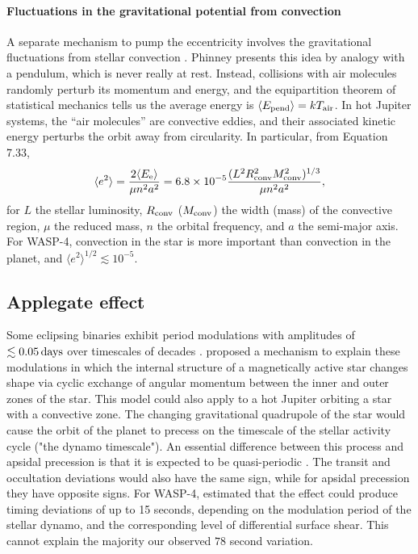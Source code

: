 \documentclass[12pt,twocolumn,tighten]{aastex62}
\begin{document}
\paragraph{Fluctuations in the gravitational potential from convection}
A separate mechanism to pump the eccentricity involves the
gravitational fluctuations from stellar convection \citep[][Section
7]{phinney_pulsars_1992}.  Phinney presents this idea by analogy with
a pendulum, which is never really at rest. Instead, collisions with
air molecules randomly perturb its momentum and energy, and the
equipartition theorem of statistical mechanics tells us the average
energy is $\langle E_{\rm pend} \rangle = k T_{\rm air}$.  In hot
Jupiter systems, the ``air molecules'' are convective eddies, and
their associated kinetic energy perturbs the orbit away from
circularity.  In particular, from \citealt{phinney_pulsars_1992}
Equation 7.33,
\begin{equation}
  \langle e^2 \rangle =
  \frac{ 2 \langle E_{\rm e} \rangle }{\mu n^2 a^2}
  = 6.8\times10^{-5}
  \frac{(L^2 R_{\rm conv}^2 M_{\rm conv}^2)^{1/3}}{\mu n^2 a^2},
\end{equation}
for $L$ the stellar luminosity, $R_{\rm conv}$ ($M_{\rm conv}$) the
width (mass) of the convective region,  $\mu$ the reduced mass, $n$
the orbital frequency, and $a$ the semi-major axis.  For WASP-4,
convection in the star is more important than convection in the
planet, and $\langle e^2 \rangle^{1/2} \lesssim 10^{-5}$.



\subsection{Applegate effect}
Some eclipsing binaries exhibit period modulations with amplitudes of
$\lesssim 0.05\,{\rm days}$ over timescales of decades \citep[{\it
e.g.},][]{soderhjelm_geometry_1980,hall_relation_1989}.
\citet{applegate_mechanism_1992} proposed a mechanism to explain these
modulations in which the internal structure of a magnetically active
star changes shape via cyclic exchange of angular momentum between the
inner and outer zones of the star.  This model could also apply to a
hot Jupiter orbiting a star with a convective zone.  The changing
gravitational quadrupole of the star would cause the orbit of the
planet to precess on the timescale of the stellar activity cycle ("the
dynamo timescale").  An essential difference between this process and
apsidal precession is that it is expected to be quasi-periodic
\citep[{\it e.g.},][Figure~12]{soderhjelm_geometry_1980}.  The transit
and occultation deviations would also have the same sign, while for
apsidal precession they have opposite signs.  For WASP-4,
\citet{watson_orbital_2010} estimated that the effect could produce
timing deviations of up to 15 seconds, depending on the modulation
period of the stellar dynamo, and the corresponding level of
differential surface shear.  This cannot explain the majority our
observed $78$ second variation.
\end{document}
